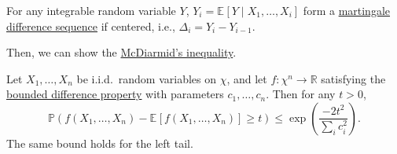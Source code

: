 \begin{note}
	For any integrable random variable \(Y\), \(Y_i = \mathbb{E}_{}\left[Y \mid X_1, \dots , X_i \right] \) form a \hyperref[def:martingale-difference-sequence]{martingale difference sequence} if centered, i.e., \(\Delta _i = Y_i - Y_{i-1}\).
\end{note}

Then, we can show the \hyperref[thm:McDiarmid-inequality]{McDiarmid's inequality}.

\begin{theorem}\label{pf-thm:McDiarmid-inequality}
	Let \(X_1, \dots , X_n\) be i.i.d.\ random variables on \(\chi \), and let \(f\colon \chi ^n \to \mathbb{R} \) satisfying the \hyperref[def:bounded-difference-property]{bounded difference property} with parameters \(c_1, \dots , c_n\). Then for any \(t > 0\),
	\[
		\mathbb{P} (f(X_1, \dots , X_n) - \mathbb{E}_{}\left[f (X_1, \dots , X_n)\right] \geq t) \leq \exp \left( \frac{-2t^2}{\sum_{i} c_i^2} \right).
	\]
	The same bound holds for the left tail.
\end{theorem}

